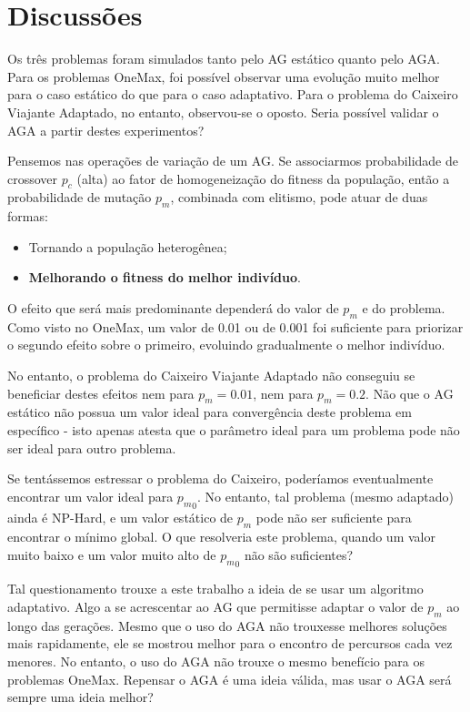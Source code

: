 \section{Discussões}

Os três problemas foram simulados tanto pelo AG estático quanto pelo AGA. Para os problemas OneMax, foi possível observar uma evolução muito melhor para o caso estático do que para o caso adaptativo. Para o problema do Caixeiro Viajante Adaptado, no entanto, observou-se o oposto. Seria possível validar o AGA a partir destes experimentos?

Pensemos nas operações de variação de um AG. Se associarmos probabilidade de crossover $p_c$ (alta) ao fator de homogeneização do fitness da população, então a probabilidade de mutação $p_m$, combinada com elitismo, pode atuar de duas formas:

\begin{itemize}
	\item Tornando a população heterogênea;
	\item \textbf{Melhorando o fitness do melhor indivíduo}.
\end{itemize}

O efeito que será mais predominante dependerá do valor de $p_m$ e do problema. Como visto no OneMax, um valor de 0.01 ou de 0.001 foi suficiente para priorizar o segundo efeito sobre o primeiro, evoluindo gradualmente o melhor indivíduo.

No entanto, o problema do Caixeiro Viajante Adaptado não conseguiu se beneficiar destes efeitos nem para $p_m=0.01$, nem para $p_m=0.2$. Não que o AG estático não possua um valor ideal para convergência deste problema em específico - isto apenas atesta que o parâmetro ideal para um problema pode não ser ideal para outro problema.

Se tentássemos estressar o problema do Caixeiro, poderíamos eventualmente encontrar um valor ideal para ${p_m}_0$. No entanto, tal problema (mesmo adaptado) ainda é NP-Hard, e um valor estático de $p_m$ pode não ser suficiente para encontrar o mínimo global. O que resolveria este problema, quando um valor muito baixo e um valor muito alto de ${p_m}_0$ não são suficientes?

Tal questionamento trouxe a este trabalho a ideia de se usar um algoritmo adaptativo. Algo a se acrescentar ao AG que permitisse adaptar o valor de $p_m$ ao longo das gerações. Mesmo que o uso do AGA não trouxesse melhores soluções mais rapidamente, ele se mostrou melhor para o encontro de percursos cada vez menores. No entanto, o uso do AGA não trouxe o mesmo benefício para os problemas OneMax. Repensar o AGA é uma ideia válida, mas usar o AGA será sempre uma ideia melhor?

